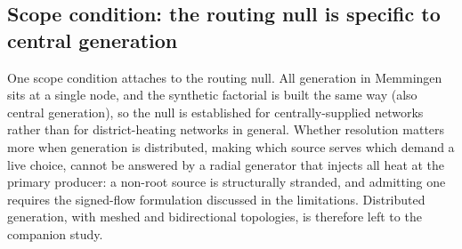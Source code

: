 \documentclass[a4paper,fleqn]{cas-sc}
\newcommand{\new}[1]{\textcolor[HTML]{1A5FB4}{#1}}   %
\newcommand{\new}[1]{#1}
\begin{document}
\new{}\label{subsec:zoneclustering}

\subsection{Scope condition: the routing null is specific to central generation}
One scope condition attaches to the routing null. All generation in Memmingen sits at a
single node, and the synthetic factorial is built the same way (also central generation), so
the null is established for centrally-supplied networks rather than for district-heating
networks in general. Whether resolution matters more when generation is distributed, making
which source serves which demand a live choice, cannot be answered by a radial generator
that injects all heat at the primary producer: a non-root source is structurally stranded,
and admitting one requires the signed-flow formulation discussed in the limitations.
Distributed generation, with meshed and bidirectional topologies, is therefore left to the
companion study.
\end{document}
